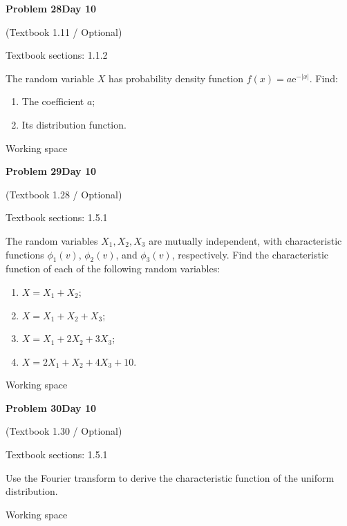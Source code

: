 \documentclass[11pt]{article}
\newcommand{\qtitle}[2]{\clearpage\begin{tcolorbox}[colback=navy,colframe=navy,arc=1.5pt,boxrule=0pt]\color{white}\large\bfseries #1\hfill\small #2\end{tcolorbox}}
\begin{document}
\qtitle{Problem 28}{Day 10}
{\small\color{accentred}(Textbook 1.11 / Optional)}\par\smallskip
{\small\color{muted}Textbook sections: 1.1.2}\par\medskip
\begin{tcolorbox}[colback=qbg,colframe=qbg,boxrule=0pt]The random variable $X$ has probability density function $f(x)=a\mathrm{e}^{-|x|}$. Find:
\begin{enumerate}
\item The coefficient $a$;
\item Its distribution function.
\end{enumerate}\end{tcolorbox}\smallskip\begin{workspace}\hfill{\color{linec}\footnotesize Working space}\end{workspace}
\qtitle{Problem 29}{Day 10}
{\small\color{accentred}(Textbook 1.28 / Optional)}\par\smallskip
{\small\color{muted}Textbook sections: 1.5.1}\par\medskip
\begin{tcolorbox}[colback=qbg,colframe=qbg,boxrule=0pt]The random variables $X_1,X_2,X_3$ are mutually independent, with characteristic functions $\phi_1(v)$, $\phi_2(v)$, and $\phi_3(v)$, respectively. Find the characteristic function of each of the following random variables:
\begin{enumerate}
\item $X=X_1+X_2$;
\item $X=X_1+X_2+X_3$;
\item $X=X_1+2X_2+3X_3$;
\item $X=2X_1+X_2+4X_3+10$.
\end{enumerate}\end{tcolorbox}\smallskip\begin{workspace}\hfill{\color{linec}\footnotesize Working space}\end{workspace}
\qtitle{Problem 30}{Day 10}
{\small\color{accentred}(Textbook 1.30 / Optional)}\par\smallskip
{\small\color{muted}Textbook sections: 1.5.1}\par\medskip
\begin{tcolorbox}[colback=qbg,colframe=qbg,boxrule=0pt]Use the Fourier transform to derive the characteristic function of the uniform distribution.\end{tcolorbox}\smallskip\begin{workspace}\hfill{\color{linec}\footnotesize Working space}\end{workspace}
\end{document}
